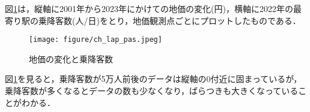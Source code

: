 図\ref{deruta_landprice_pas}は，縦軸に2001年から2023年にかけての地価の変化(円)，横軸に2022年の最寄り駅の乗降客数(人/日)をとり，地価観測点ごとにプロットしたものである．
\begin{figure}[H]
  \centering
  \texttt{[image: figure/ch\_lap\_pas.jpeg]}
  \caption{地価の変化と乗降客数}
  \label{deruta_landprice_pas}
\end{figure}
図\ref{deruta_landprice_pas}を見ると，乗降客数が5万人前後のデータは縦軸の0付近に固まっているが，乗降客数が多くなるとデータの数も少なくなり，ばらつきも大きくなっていることがわかる．




